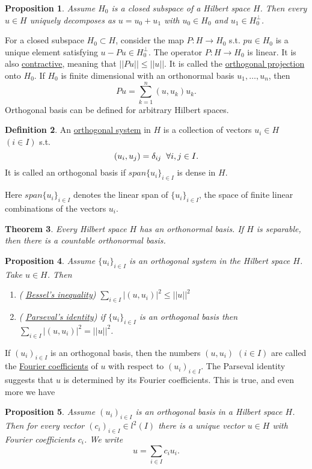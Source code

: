 \documentclass{article}
\newtheorem{theorem}{Theorem}[section]
\newtheorem{proposition}[theorem]{Proposition}
\theoremstyle{definition}
\newtheorem{definition}[theorem]{Definition}
\newcommand{\tmm}{\hspace{2mm}}
\begin{document}
\begin{proposition}
    Assume $H_0$ is a closed subspace of a Hilbert space $H$. Then every $u\in H$ uniquely decomposes as $u = u_0+u_1$ with $u_0\in H_0$ and $u_1\in H_0^\perp$.
\end{proposition}
For a closed subspace $H_0\subset H$, consider the map $P:H\rightarrow H_0$ s.t. $pu\in H_0$ is a unique element satisfying $u-Pu\in H_0^\perp$.
The operator $P:H\rightarrow H_0$ is linear. It is also \underline{contractive}, meaning that $||Pu||\leq ||u||$. It is called the \underline{orthogonal projection} onto $H_0$.
If $H_0$ is finite dimensional with an orthonormal basis $u_1,\ldots,u_n$, then 
$$Pu = \sum_{k=1}^{n}(u,u_k)u_k.$$
Orthogonal basis can be defined for arbitrary Hilbert spaces. 
\begin{definition}
    An \underline{orthogonal system} in $H$ is a collection of vectors $u_i\in H$ $(i\in I)$ s.t. 
    $$(u_i,u_j)=\delta_{ij}\tmm \forall i,j\in I.$$
    It is called an orthogonal basis if $span\{u_i\}_{i\in I}$ is dense in $H$.

    Here $span\{u_i\}_{i\in I}$ denotes the linear span of $\{u_i\}_{i\in I}$, the space of finite linear combinations of the vectors $u_i$. 
\end{definition}

\begin{theorem}
    Every Hilbert space $H$ has an orthonormal basis. If $H$ is separable, then there is a countable orthonormal basis. 
\end{theorem}

\begin{proposition}
    Assume $\{u_i \}_{i\in I}$ is an orthogonal system in the Hilbert space $H$. Take $u\in H$. Then 
    \begin{enumerate}
        \item ( \underline{Bessel's inequality}) $\sum_{i\in I}|(u,u_i)|^2\leq ||u||^2$ 
        \item ( \underline{Parseval's identity}) if $\{u_i\}_{i\in I}$ is an orthogonal basis then $\sum_{i\in I}|(u,u_i)|^2 = ||u||^2$.
    \end{enumerate}
\end{proposition}

If $(u_i)_{i\in I}$ is an orthogonal basis, then the numbers $(u,u_i)$ $(i\in I)$ are called the \underline{Fourier coefficients} of $u$
with respect to $(u_i)_{i\in I}$. The Parseval identity suggests that $u$ is determined by its Fourier coefficients. This is true, and even more we have
\begin{proposition}
    Assume $(u_i)_{i\in I}$ is an orthogonal basis in a Hilbert space $H$. Then for every vector $(c_i)_{i\in I}\in l^2(I)$ there is a unique vector $u\in H$ with Fourier coefficients $c_i$.
    We write $$u = \sum_{i\in I} c_i u_i.$$
\end{proposition}
\end{document}
